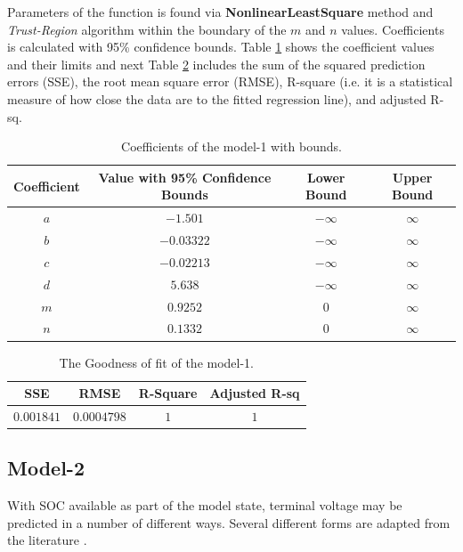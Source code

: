\documentclass[12pt]{article}
\begin{document}
\begin{appendices}
\par \noindent Parameters of the function is found via \textbf{NonlinearLeastSquare} method and \textit{Trust-Region} algorithm within the boundary of the $m$ and $n$ values. Coefficients is calculated with 95\% confidence bounds. Table \ref{table:OCV_SOC_Model_1_1} shows the coefficient values and their limits and next Table \ref{table:OCV_SOC_Model_1_2} includes the sum of the squared prediction errors (SSE), the root mean square error (RMSE), R-square (i.e. it is a statistical measure of how close the data are to the fitted regression line), and adjusted R-sq.

\begin{table}[!t]
	\center
	\begin{tabular}{||c | c | c | c ||} 
		\hline
		Coefficient & Value with 95\% Confidence Bounds & Lower Bound & Upper Bound \\ [0.5ex] 
		\hline\hline
		$a$ & $-1.501$  & $-\infty$ & $\infty$ \\ 
		\hline
		$b$ & $-0.03322$ & $-\infty$ & $\infty$ \\
		\hline
		$c$ & $-0.02213$ & $-\infty$ & $\infty$ \\
		\hline
		$d$ & $5.638$ & $-\infty$ & $\infty$ \\
		\hline
		$m$ & $0.9252$ & $0$ & $\infty$ \\
		\hline
		$n$ & $0.1332$ & $0$ & $\infty$ \\
		\hline
	\end{tabular}
	\caption{\label{table:OCV_SOC_Model_1_1}Coefficients of the model-1 with bounds.}
\end{table}

\begin{table}[!t]
	\center
	\begin{tabular}{||c | c | c | c ||} 
		\hline
		SSE & RMSE & R-Square & Adjusted R-sq\\ [0.5ex] 
		\hline\hline
		$0.001841$ & $0.0004798$  & $1$ & $1$ \\ 
		\hline
	\end{tabular}
	\caption{\label{table:OCV_SOC_Model_1_2}The Goodness of fit of the model-1.}
\end{table}

\subsection{Model-2} \label{Model-2}
With SOC available as part of the model state, terminal
voltage may be predicted in a number of different ways.
Several different forms are adapted from the literature \cite{Plett2004}. \newline


\end{appendices}
\end{document}
